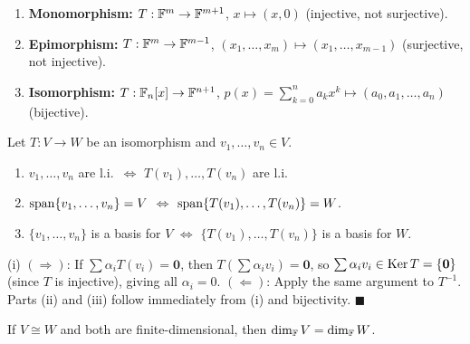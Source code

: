 \begin{exbox}
\begin{enumerate}
    \item \textbf{Monomorphism:} $T:\mathbb{F}^m\to\mathbb{F}^{m+1}$,\; $x\mapsto(x,0)$
          (injective, not surjective).
    \item \textbf{Epimorphism:} $T:\mathbb{F}^m\to\mathbb{F}^{m-1}$,\;
          $(x_1,\ldots,x_m)\mapsto(x_1,\ldots,x_{m-1})$
          (surjective, not injective).
    \item \textbf{Isomorphism:} $T:\mathbb{F}_n[x]\to\mathbb{F}^{n+1}$,\;
          $p(x)=\sum_{k=0}^n a_k x^k\mapsto(a_0,a_1,\ldots,a_n)$ (bijective).
\end{enumerate}
\end{exbox}

\begin{propbox}
\label{prop:iso-preserves}
Let $T:V\to W$ be an isomorphism and $v_1,\ldots,v_n\in V$.
\begin{enumerate}[label=(\roman*)]
    \item $v_1,\ldots,v_n$ are l.i.\ $\iff$ $T(v_1),\ldots,T(v_n)$ are l.i.
    \item $\operatorname{span}\{v_1,\ldots,v_n\}=V$ $\iff$ $\operatorname{span}\{T(v_1),\ldots,T(v_n)\}=W$.
    \item $\{v_1,\ldots,v_n\}$ is a basis for $V$ $\iff$
          $\{T(v_1),\ldots,T(v_n)\}$ is a basis for $W$.
\end{enumerate}
\end{propbox}

\begin{proofbox}
(i) $(\Rightarrow)$: If $\sum\alpha_i T(v_i)=\mathbf{0}$, then
$T(\sum\alpha_i v_i)=\mathbf{0}$, so $\sum\alpha_i v_i\in\operatorname{Ker} T=\{\mathbf{0}\}$
(since $T$ is injective), giving all $\alpha_i=0$.
$(\Leftarrow)$: Apply the same argument to $T^{-1}$.
Parts (ii) and (iii) follow immediately from (i) and bijectivity.
\hfill$\blacksquare$
\end{proofbox}

\begin{propbox}
\label{prop:iso-same-dim}
If $V\cong W$ and both are finite-dimensional, then $\operatorname{dim}_{\mathbb{F}} V=\operatorname{dim}_{\mathbb{F}} W$.
\end{propbox}

